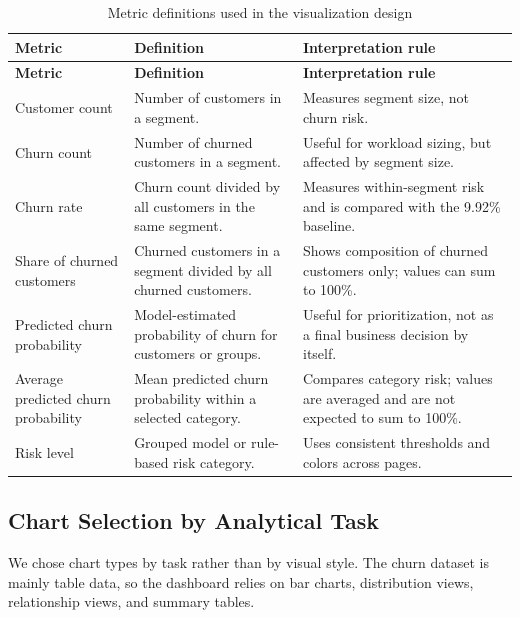 \begin{longtable}{p{}p{}p{}}
\caption{Metric definitions used in the visualization design}\\
\toprule
\textbf{Metric} & \textbf{Definition} & \textbf{Interpretation rule} \\
\midrule
\endfirsthead
\toprule
\textbf{Metric} & \textbf{Definition} & \textbf{Interpretation rule} \\
\midrule
\endhead
Customer count &
Number of customers in a segment. &
Measures segment size, not churn risk. \\
Churn count &
Number of churned customers in a segment. &
Useful for workload sizing, but affected by segment size. \\
Churn rate &
Churn count divided by all customers in the same segment. &
Measures within-segment risk and is compared with the 9.92\% baseline. \\
Share of churned customers &
Churned customers in a segment divided by all churned customers. &
Shows composition of churned customers only; values can sum to 100\%. \\
Predicted churn probability &
Model-estimated probability of churn for customers or groups. &
Useful for prioritization, not as a final business decision by itself. \\
Average predicted churn probability &
Mean predicted churn probability within a selected category. &
Compares category risk; values are averaged and are not expected to sum to 100\%. \\
Risk level &
Grouped model or rule-based risk category. &
Uses consistent thresholds and colors across pages. \\
\bottomrule
\end{longtable}

\subsection{Chart Selection by Analytical Task}
We chose chart types by task rather than by visual style. The churn dataset is
mainly table data, so the dashboard relies on bar charts, distribution views,
relationship views, and summary tables.


